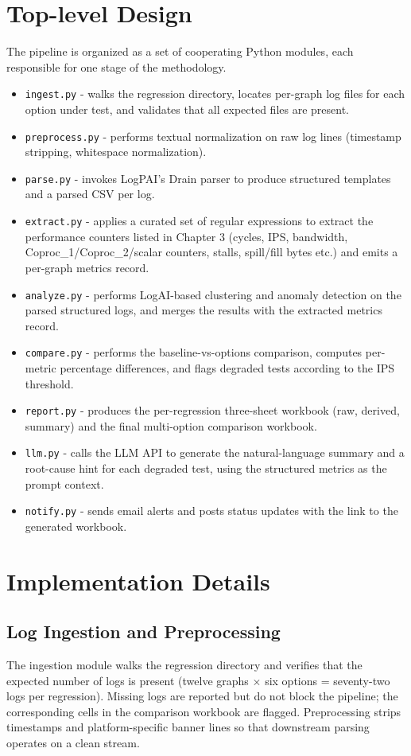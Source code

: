 \section{Top-level Design}
The pipeline is organized as a set of cooperating Python modules, each responsible for one stage of the methodology.
\begin{itemize}
\item \texttt{ingest.py} - walks the regression directory, locates per-graph log files for each option under test, and validates that all expected files are present.
\item \texttt{preprocess.py} - performs textual normalization on raw log lines (timestamp stripping, whitespace normalization).
\item \texttt{parse.py} - invokes LogPAI's Drain parser to produce structured templates and a parsed CSV per log.
\item \texttt{extract.py} - applies a curated set of regular expressions to extract the performance counters listed in Chapter 3 (cycles, IPS, bandwidth, Coproc\_1/Coproc\_2/scalar counters, stalls, spill/fill bytes etc.) and emits a per-graph metrics record.
\item \texttt{analyze.py} - performs LogAI-based clustering and anomaly detection on the parsed structured logs, and merges the results with the extracted metrics record.
\item \texttt{compare.py} - performs the baseline-vs-options comparison, computes per-metric percentage differences, and flags degraded tests according to the IPS threshold.
\item \texttt{report.py} - produces the per-regression three-sheet workbook (raw, derived, summary) and the final multi-option comparison workbook.
\item \texttt{llm.py} - calls the LLM API to generate the natural-language summary and a root-cause hint for each degraded test, using the structured metrics as the prompt context.
\item \texttt{notify.py} - sends email alerts and posts status updates with the link to the generated workbook.
\end{itemize}

\section{Implementation Details}

\subsection{Log Ingestion and Preprocessing}
The ingestion module walks the regression directory and verifies that the expected number of logs is present (twelve graphs $\times$ six options = seventy-two logs per regression). Missing logs are reported but do not block the pipeline; the corresponding cells in the comparison workbook are flagged. Preprocessing strips timestamps and platform-specific banner lines so that downstream parsing operates on a clean stream.


